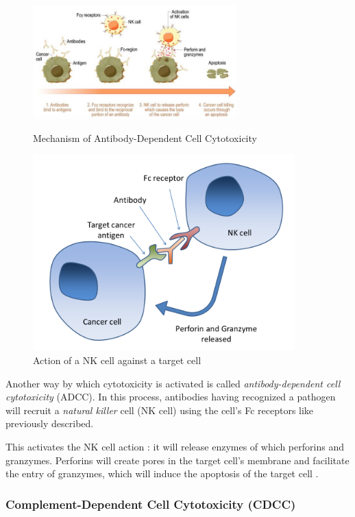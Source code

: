 \begin{figure}[H]
    \begin{minipage}{0.69\textwidth}
        \centering
        \includegraphics[width=0.7\textwidth]{../Images/ADCC.jpg}
        \caption{Mechanism of Antibody-Dependent Cell Cytotoxicity}
        \label{fig:ADCC}
    \end{minipage}\hfill
    \begin{minipage}{0.39\textwidth}
        \centering
        \includegraphics[width=0.9\textwidth]{../Images/Antibody-dependent_cell-mediated_cytotoxicity.png}   
        \caption{Action of a NK cell against a target cell}
        \label{fig:ADCC-NKcell}
    \end{minipage}
\end{figure}

Another way by which cytotoxicity is activated is called 
\emph{antibody-dependent cell cytotoxicity} (ADCC). In this process,
antibodies having recognized a pathogen will recruit a 
\emph{natural killer} cell (NK cell) using the cell's Fc receptors
like previously described.

This activates the NK cell action : it will release enzymes of which perforins
and granzymes. Perforins will create pores in the target cell's membrane and 
facilitate the entry of granzymes, which will induce the apoptosis
of the target cell \cite{paul_molecular_2017}.

\subsubsection{Complement-Dependent Cell Cytotoxicity (CDCC)}
